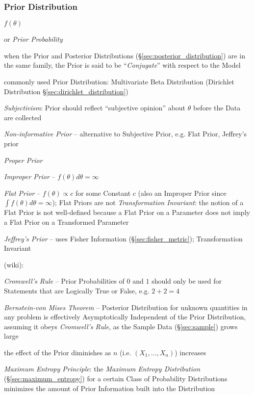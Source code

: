 \subsubsection{Prior Distribution}\label{sec:prior_distribution}

$f(\theta)$

or \emph{Prior Probability}

when the Prior and Posterior Distributions (\S\ref{sec:posterior_distribution})
are in the same family, the Prior is said to be ``\emph{Conjugate}'' with
respect to the Model

commonly used Prior Distribution: Multivariate Beta Distribution (Dirichlet
Distribution \S\ref{sec:dirichlet_distribution})

\emph{Subjectivism}: Prior should reflect ``subjective opinion'' about $\theta$
before the Data are collected

\emph{Non-informative Prior} -- alternative to Subjective Prior, e.g. Flat
Prior, Jeffrey's prior

\emph{Proper Prior}

\emph{Improper Prior} -- $f(\theta) d\theta = \infty$

\emph{Flat Prior} -- $f(\theta) \propto c$ for some Constant $c$ (also an
Improper Prior since $\int f(\theta) d\theta = \infty$); Flat Priors are not
\emph{Transformation Invariant}: the notion of a Flat Prior is not well-defined
because a Flat Prior on a Parameter does not imply a Flat Prior on a Transformed
Parameter

\emph{Jeffrey's Prior} -- uses Fisher Information (\S\ref{sec:fisher_metric});
Transformation Invariant

(wiki):

\emph{Cromwell's Rule} -- Prior Probabilities of $0$ and $1$ should only be used
for Statements that are Logically True or False, e.g. $2+2 = 4$

\emph{Bernstein-von Mises Theorem} -- Posterior Distribution for unknown
quantities in any problem is effectively Asymptotically Independent of the Prior
Distribution, assuming it obeys \emph{Cromwell's Rule}, as the Sample Data
(\S\ref{sec:sample}) grows large

the effect of the Prior diminishes as $n$ (i.e. $(X_1, \ldots, X_n)$) increases

\emph{Maximum Entropy Principle}: the \emph{Maximum Entropy Distribution}
(\S\ref{sec:maximum_entropy}) for a certain Class of Probability Distributions
minimizes the amount of Prior Information built into the Distribution



